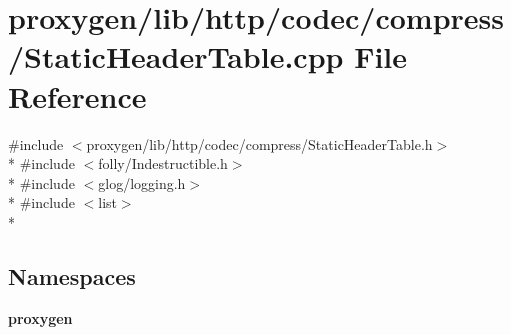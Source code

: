 \section{proxygen/lib/http/codec/compress/\+Static\+Header\+Table.cpp File Reference}
\label{StaticHeaderTable_8cpp}
{\ttfamily \#include $<$proxygen/lib/http/codec/compress/\+Static\+Header\+Table.\+h$>$}\\*
{\ttfamily \#include $<$folly/\+Indestructible.\+h$>$}\\*
{\ttfamily \#include $<$glog/logging.\+h$>$}\\*
{\ttfamily \#include $<$list$>$}\\*
\subsection*{Namespaces}
\begin{DoxyCompactItemize}
\item 
 {\bf proxygen}
\end{DoxyCompactItemize}

